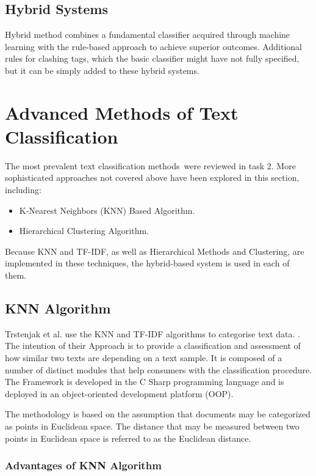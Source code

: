 \documentclass[a4paper]{article}
\begin{document}
\subsection{Hybrid Systems}
Hybrid method combines a fundamental classifier acquired through machine learning with the rule-based approach to achieve superior outcomes. Additional rules for clashing tags, which the basic classifier might have not fully specified, but it can be simply added to these hybrid systems.

\section{Advanced Methods of Text Classification}
The most prevalent text classification methods were reviewed in task 2. More sophisticated approaches not covered above have been explored in this section, including:

\begin{itemize}
    \item K-Nearest Neighbors (KNN) Based Algorithm.
    \item Hierarchical Clustering Algorithm.
\end{itemize}

Because KNN and TF-IDF, as well as Hierarchical Methods and Clustering, are implemented in these techniques, the hybrid-based system is used in each of them.

\subsection{KNN Algorithm}
Trstenjak et al. use the KNN and TF-IDF algorithms to categorise text data. \cite{ES9}. The intention of their Approach is to provide a classification and assessment of how similar two texts are depending on a text sample. It is composed of a number of distinct modules that help consumers with the classification procedure. The Framework is developed in the C Sharp programming language and is deployed in an object-oriented development platform (OOP).

The methodology is based on the assumption that documents may be categorized as points in Euclidean space. The distance that may be measured between two points in Euclidean space is referred to as the Euclidean distance.

\subsubsection{Advantages of KNN Algorithm}
\end{document}
